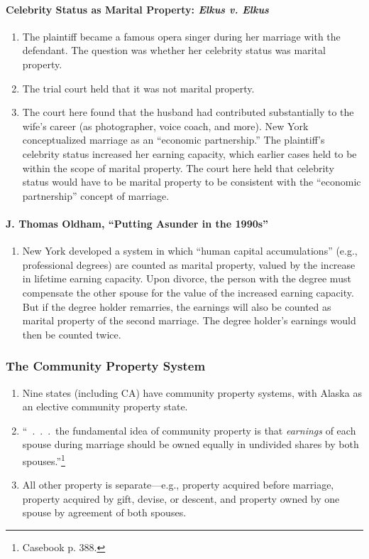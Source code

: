 \paragraph{Celebrity Status as Marital Property: \emph{Elkus v. Elkus}}

\begin{enumerate}
    \item The plaintiff became a famous opera singer during her marriage with 
    the defendant. The question was whether her celebrity status was marital 
    property.
    \item The trial court held that it was not marital property.
    \item The court here found that the husband had contributed substantially 
    to the wife's career (as photographer, voice coach, and more). New York 
    conceptualized marriage as an ``economic partnership.'' The plaintiff's 
    celebrity status increased her earning capacity, which earlier cases held 
    to be within the scope of marital property. The court here held that 
    celebrity status would have to be marital property to be consistent with 
    the ``economic partnership'' concept of marriage.
\end{enumerate}

\paragraph{J. Thomas Oldham, ``Putting Asunder in the 1990s''}

\begin{enumerate}
    \item New York developed a system in which ``human capital accumulations'' 
    (e.g., professional degrees) are counted as marital property, valued by 
    the increase in lifetime earning capacity. Upon divorce, the person with 
    the degree must compensate the other spouse for the value of the increased 
    earning capacity. But if the degree holder remarries, the earnings will 
    also be counted as marital property of the second marriage. The degree 
    holder's earnings would then be counted twice.
\end{enumerate}

\subsubsection{The Community Property System}

\begin{enumerate}
    \item Nine states (including CA) have community property systems, with 
    Alaska as an elective community property state.
    \item ``~.~.~.~the fundamental idea of community property is that 
    \emph{earnings} of each spouse during marriage should be owned equally in 
    undivided shares by both spouses.''\footnote{Casebook p. 388.}
    \item All other property is separate---e.g., property acquired before 
    marriage, property acquired by gift, devise, or descent, and property 
    owned by one spouse by agreement of both spouses.
\end{enumerate}

